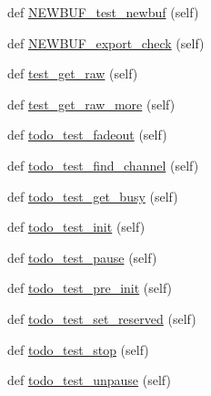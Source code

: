 \begin{DoxyCompactItemize}
\item 
def \hyperlink{namespacepygame_1_1tests_1_1mixer__test_abaa1ca1adb2f48e53405f31222c97dcb}{N\+E\+W\+B\+U\+F\+\_\+test\+\_\+newbuf} (self)
\item 
def \hyperlink{namespacepygame_1_1tests_1_1mixer__test_acf0b778c725b5c75ab943e813e47f4d9}{N\+E\+W\+B\+U\+F\+\_\+export\+\_\+check} (self)
\item 
def \hyperlink{namespacepygame_1_1tests_1_1mixer__test_ae5a2778fac890373c37965b32b185c25}{test\+\_\+get\+\_\+raw} (self)
\item 
def \hyperlink{namespacepygame_1_1tests_1_1mixer__test_a389d343f12c73634a273569f07f8d0ca}{test\+\_\+get\+\_\+raw\+\_\+more} (self)
\item 
def \hyperlink{namespacepygame_1_1tests_1_1mixer__test_a4633c1585fa9ba269838cd8ffd32a08b}{todo\+\_\+test\+\_\+fadeout} (self)
\item 
def \hyperlink{namespacepygame_1_1tests_1_1mixer__test_a8b1614a58e14a1d73c4455d22572b944}{todo\+\_\+test\+\_\+find\+\_\+channel} (self)
\item 
def \hyperlink{namespacepygame_1_1tests_1_1mixer__test_a12988da90469a3d63163f674bb0ba8b0}{todo\+\_\+test\+\_\+get\+\_\+busy} (self)
\item 
def \hyperlink{namespacepygame_1_1tests_1_1mixer__test_a10dc65ebfce36eb360eced6ac2674643}{todo\+\_\+test\+\_\+init} (self)
\item 
def \hyperlink{namespacepygame_1_1tests_1_1mixer__test_a6ff244af041a6aac2e45ed1b1ed4b9af}{todo\+\_\+test\+\_\+pause} (self)
\item 
def \hyperlink{namespacepygame_1_1tests_1_1mixer__test_a67021363aceedda3fa2a04b35983110b}{todo\+\_\+test\+\_\+pre\+\_\+init} (self)
\item 
def \hyperlink{namespacepygame_1_1tests_1_1mixer__test_a8718918153d3ca2cdc7235765bbe95a9}{todo\+\_\+test\+\_\+set\+\_\+reserved} (self)
\item 
def \hyperlink{namespacepygame_1_1tests_1_1mixer__test_aeb20e7f42506ceb6ada71d7b8369295f}{todo\+\_\+test\+\_\+stop} (self)
\item 
def \hyperlink{namespacepygame_1_1tests_1_1mixer__test_af8f7f5d5a3abfe92d1b718c508680daf}{todo\+\_\+test\+\_\+unpause} (self)
\end{DoxyCompactItemize}
